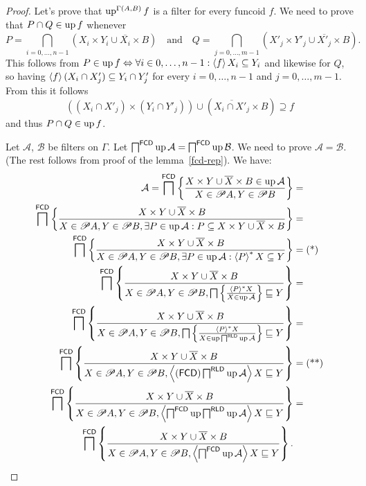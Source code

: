 \begin{proof}
Let's prove that $\operatorname{up}^{\Gamma(A,B)}f$ is a filter for every funcoid
$f$. We need to prove that $P\cap Q\in\operatorname{up} f$ whenever 
\[
P=\bigcap_{i=0,\ldots,n-1}\left(X_{i}\times Y_{i}\cup\overline{X_{i}}\times B\right)\quad\text{and}\quad Q=\bigcap_{j=0,\ldots,m-1}\left(X'_{j}\times Y'_{j}\cup\overline{X'_{j}}\times B\right).
\]
This follows from $P\in\operatorname{up} f\Leftrightarrow\forall i\in0,\ldots,n-1:\left\langle f\right\rangle X_{i}\subseteq Y_{i}$
and likewise for $Q$, so having $\left\langle f\right\rangle(X_{i}\cap X'_{j})\subseteq Y_{i}\cap Y'_{j}$
for every $i=0,\ldots,n-1$ and $j=0,\ldots,m-1$. From this it follows
\[
((X_{i}\cap X'_{j})\times(Y_{i}\cap Y'_{j}))\cup\left(\overline{X_{i}\cap X'_{j}}\times B\right)\supseteq f
\]
and thus $P\cap Q\in\operatorname{up} f$.

Let $\mathcal{A}$, $\mathcal{B}$ be filters on $\Gamma$. Let $\bigsqcap^{\mathsf{FCD}}\operatorname{up}\mathcal{A}=\bigsqcap^{\mathsf{FCD}}\operatorname{up}\mathcal{B}$.
We need to prove $\mathcal{A}=\mathcal{B}$. (The rest follows from
proof of the lemma~\ref{fcd-rep}). We have:
\begin{align*}
\mathcal{A}=\bigsqcap^{\mathsf{FCD}}\left\{ \frac{X\times Y\cup\overline{X}\times B\in\operatorname{up}\mathcal{A}}{X\in\mathscr{P} A,Y\in\mathscr{P} B}\right\} & =\\
\bigsqcap^{\mathsf{FCD}}\left\{ \frac{X\times Y\cup\overline{X}\times B}{X\in\mathscr{P} A,Y\in\mathscr{P} B,\exists P\in\operatorname{up}\mathcal{A}:P\subseteq X\times Y\cup\overline{X}\times B}\right\} & =\\
\bigsqcap^{\mathsf{FCD}}\left\{ \frac{X\times Y\cup\overline{X}\times B}{X\in\mathscr{P} A,Y\in\mathscr{P} B,\exists P\in\operatorname{up}\mathcal{A}:\left\langle P\right\rangle ^{\ast}X\subseteq Y}\right\} & =\text{(*)}\\
\bigsqcap^{\mathsf{FCD}}\left\{ \frac{X\times Y\cup\overline{X}\times B}{X\in\mathscr{P} A,Y\in\mathscr{P} B,\bigsqcap\left\{ \frac{\left\langle P\right\rangle ^{\ast}X}{X\in\operatorname{up}\mathcal{A}}\right\}\sqsubseteq Y}\right\} & =\\
\bigsqcap^{\mathsf{FCD}}\left\{ \frac{X\times Y\cup\overline{X}\times B}{X\in\mathscr{P} A,Y\in\mathscr{P} B,\bigsqcap\left\{ \frac{\left\langle P\right\rangle ^{\ast}X}{X\in\operatorname{up}\bigsqcap^{\mathsf{RLD}}\operatorname{up}\mathcal{A}}\right\}\sqsubseteq Y}\right\} & =\\
\bigsqcap^{\mathsf{FCD}}\left\{ \frac{X\times Y\cup\overline{X}\times B}{X\in\mathscr{P} A,Y\in\mathscr{P} B,\left\langle (\mathsf{FCD})\bigsqcap^{\mathsf{RLD}}\operatorname{up}\mathcal{A}\right\rangle X\sqsubseteq Y}\right\} & =\text{(**)}\\
\bigsqcap^{\mathsf{FCD}}\left\{ \frac{X\times Y\cup\overline{X}\times B}{X\in\mathscr{P} A,Y\in\mathscr{P} B,\left\langle \bigsqcap^{\mathsf{FCD}}\operatorname{up}\bigsqcap^{\mathsf{RLD}}\operatorname{up}\mathcal{A}\right\rangle X\sqsubseteq Y}\right\} & =\\
\bigsqcap^{\mathsf{FCD}}\left\{ \frac{X\times Y\cup\overline{X}\times B}{X\in\mathscr{P} A,Y\in\mathscr{P} B,\left\langle \bigsqcap^{\mathsf{FCD}}\operatorname{up}\mathcal{A}\right\rangle X\sqsubseteq Y}\right\}.
\end{align*}



\end{proof}
